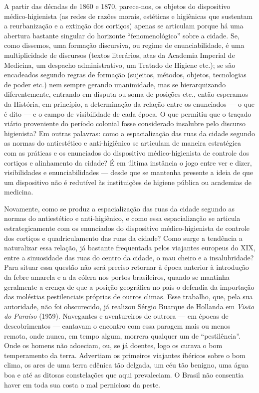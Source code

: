 A partir das décadas de 1860 e 1870, parece-nos, os objetos do
dispositivo médico-higienista (as redes de razões morais, estéticas e
higiênicas que sustentam a reurbanização e a extinção dos cortiços)
apenas se articulam porque há uma abertura bastante singular do
horizonte ``fenomenológico'' sobre a cidade. Se, como dissemos, uma
formação discursiva, ou regime de enunciabilidade, é uma multiplicidade
de discursos (textos literários, atas da Academia Imperial de Medicina,
um despacho administrativo, um Tratado de Higiene etc.); se são
encadeados segundo regras de formação (sujeitos, métodos, objetos,
tecnologias de poder etc.) nem sempre gerando unanimidade, mas se
hierarquizando diferentemente, entrando em disputa ou soma de posições
etc., então esperamos da História, em princípio, a determinação da
relação entre os enunciados --- o que é dito --- e o campo de visibilidade
de cada época. O que permitiu que o traçado viário proveniente do
período colonial fosse considerado insalubre pelo discurso higienista?
Em outras palavras: como a espacialização das ruas da cidade segundo as
normas do antiestético e anti-higiênico se articulam de maneira
estratégica com as práticas e os enunciados do dispositivo
médico-higienista de controle dos cortiços e alinhamento da cidade? É em
última instância o jogo entre ver e dizer, visibilidades e
enunciabilidades --- desde que se mantenha presente a ideia de que um
dispositivo não é redutível às instituições de higiene pública ou
academias de medicina.

Novamente, como se produz a espacialização das ruas da cidade segundo as
normas do antiestético e anti-higiênico, e como essa espacialização se
articula estrategicamente com os enunciados do dispositivo
médico-higienista de controle dos cortiços e quadriculamento das ruas da
cidade? Como surge a tendência a naturalizar essa relação, já bastante
frequentada pelos viajantes europeus do XIX, entre a sinuosidade das
ruas do centro da cidade, o mau cheiro e a insalubridade? Para situar
essa questão não será preciso retornar à época anterior à introdução da
febre amarela e a da cólera nos portos brasileiros, quando se mantinha
geralmente a crença de que a posição geográfica no país o defendia da
importação das moléstias pestilenciais próprias de outros climas. Esse
trabalho, que, pela sua autoridade, não foi obscurecido, já realizou
Sérgio Buarque de Hollanda em \textit{Visão do Paraíso} (1959). Navegantes
e aventureiros de outrora --- em épocas de descobrimentos --- cantavam o
encontro com essa paragem mais ou menos remota, onde nunca, em tempo
algum, morrera qualquer um de ``pestilência''. Onde os homens não
adoeciam, ou, se já doentes, logo os curava o bom temperamento da terra.
Advertiam os primeiros viajantes ibéricos sobre o bom clima, os ares de
uma terra edênica tão delgada, um céu tão benigno, uma água boa e até as
ditosas constelações que aqui prevaleciam. O Brasil não consentia haver
em toda sua costa o mal pernicioso da peste.

